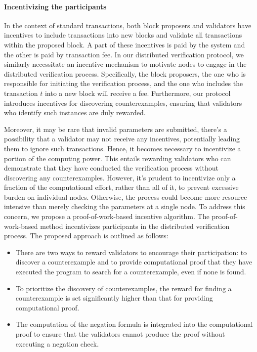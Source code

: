 \documentclass[runningheads]{llncs}
\begin{document}
\paragraph{Incentivizing the participants}  In the context of standard transactions, both block proposers and validators have incentives to include transactions into new blocks and validate all transactions within the proposed block. A part of these incentives is paid by the system and the other is paid by transaction fee. In our distributed verification protocol, we similarly necessitate an incentive mechanism to motivate nodes to engage in the distributed verification process. Specifically, the block proposers, the one who is responsible for initiating the verification process, and the one who includes the transaction $t$ into a new block will receive a fee. Furthermore, our protocol introduces incentives for discovering counterexamples, ensuring that validators who identify such instances are duly rewarded.

Moreover, it may be rare that invalid parameters are submitted, there's a possibility that a validator may not receive any incentives, potentially leading them to ignore such transactions. Hence, it becomes necessary to incentivize a portion of the computing power. This entails rewarding validators who can demonstrate that they have conducted the verification process without discovering any counterexamples. However, it's prudent to incentivize only a fraction of the computational effort, rather than all of it, to prevent excessive burden on individual nodes. Otherwise, the process could become more resource-intensive than merely checking the parameters at a single node. To address this concern, we propose a proof-of-work-based incentive algorithm. The proof-of-work-based method incentivizes participants in the distributed verification process. The proposed approach is outlined as follows:

\begin{itemize}
\item There are two ways to reward validators to encourage their participation: to discover a counterexample and to provide computational proof that they have executed the program to search for a counterexample, even if none is found.
\item To prioritize the discovery of counterexamples, the reward for finding a counterexample is set significantly higher than that for providing computational proof.
\item The computation of the negation formula is integrated into the computational proof to ensure that the validators cannot produce the proof without executing a negation check.
\end{itemize}
\end{document}
